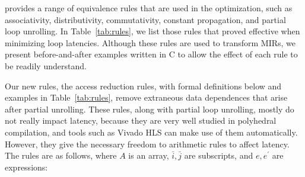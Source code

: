 \SOAP{} provides a range of equivalence rules that are used in the
optimization, such as associativity, distributivity, commutativity, constant
propagation, and partial loop unrolling.  In Table~\ref{tab:rules}, we list
those rules that proved effective when minimizing loop latencies.  Although
these rules are used to transform MIRs, we present before-and-after examples
written in C to allow the effect of each rule to be readily understand.

Our new rules, the access reduction rules, with formal definitions below and
examples in Table~\ref{tab:rules}, remove extraneous data dependences that
arise after partial unrolling.  These rules, along with partial loop unrolling,
mostly do not really impact latency, because they are very well studied in
polyhedral compilation, and tools such as Vivado HLS can make use of them
automatically.  However, they give the necessary freedom to arithmetic rules
to affect latency.  The rules are as follows, where $A$ is an array, $\bar{i},
\bar{j}$ are subscripts, and $e, e^\prime$ are expressions:
